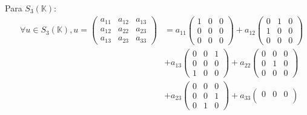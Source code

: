 \begin{ejercicio}
	Para $S_3(\mathbb{K})$:
	\begin{align*}
		\quad \forall u \in S_3(\mathbb{K}), u = \begin{pmatrix}
			                                         a_{11} & a_{12} & a_{13} \\
			                                         a_{12} & a_{22} & a_{23} \\
			                                         a_{13} & a_{23} & a_{33}
		                                         \end{pmatrix} & = a_{11} \begin{pmatrix}
			                                                                  1 & 0 & 0 \\
			                                                                  0 & 0 & 0 \\
			                                                                  0 & 0 & 0
		                                                                  \end{pmatrix} + a_{12} \begin{pmatrix}
			                                                                                         0 & 1 & 0 \\
			                                                                                         1 & 0 & 0 \\
			                                                                                         0 & 0 & 0
		                                                                                         \end{pmatrix} \\ &+ a_{13} \begin{pmatrix}
			0 & 0 & 1 \\
			0 & 0 & 0 \\
			1 & 0 & 0
		\end{pmatrix} + a_{22} \begin{pmatrix}
			0 & 0 & 0 \\
			0 & 1 & 0 \\
			0 & 0 & 0
		\end{pmatrix} \\ &+ a_{23} \begin{pmatrix}
			0 & 0 & 0 \\
			0 & 0 & 1 \\
			0 & 1 & 0
		\end{pmatrix} + a_{33} \begin{pmatrix}
			0 & 0 & 0 \\

\end{pmatrix}
\end{align*}
\end{ejercicio}
